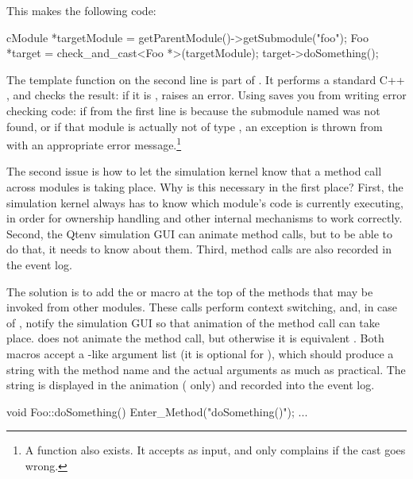 This makes the following code:

\begin{cpp}
cModule *targetModule = getParentModule()->getSubmodule("foo");
Foo *target = check_and_cast<Foo *>(targetModule);
target->doSomething();
\end{cpp}

The  template function on the second line
is part of {\opp}. It performs a standard C++ , and checks
the result: if it is ,  raises an {\opp} error.
Using  saves you from writing error checking
code: if  from the first line is  because
the submodule named  was not found, or if that
module is actually not of type , an exception is thrown
from  with an appropriate error message.\footnote{A
 function also exists. It
accepts  as input, and only complains if the cast
goes wrong.}

The second issue is how to let the simulation kernel know that
a method call across modules is taking place. Why is this necessary
in the first place? First, the simulation kernel always has to know which
module's code is currently executing, in order for ownership handling
and other internal mechanisms to work correctly. Second, the Qtenv
simulation GUI can animate method calls, but to be able to do that,
it needs to know about them. Third, method calls are also recorded
in the event log.

The solution is to add the  or 
macro at the top of the methods that may be invoked from other
modules. These calls perform context switching, and, in case of
, notify the simulation GUI so that animation
of the method call can take place. 
does not animate the method call, but otherwise it is equivalent
. Both macros accept a -like
argument list (it is optional for ),
which should produce a string with the method name and the
actual arguments as much as practical. The string is displayed in
the animation ( only) and recorded into the event log.


\begin{cpp}
void Foo::doSomething()
{
    Enter_Method("doSomething()");
    ...
}
\end{cpp}



